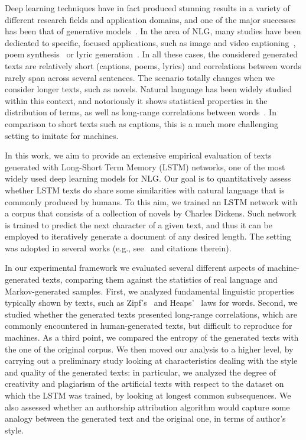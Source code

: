 \documentclass[journal]{IEEEtran}
\begin{document}
Deep learning techniques have in fact produced stunning results in a variety of different research fields and application domains, and one of the major successes has been that of generative models~\cite{Bengio2009}. In the area of NLG, many studies have been dedicated to specific, focused applications, such as image and video captioning~\cite{Karpathy2015,Venugopalan2015}, poem synthesis~\cite{Zhang2014} or lyric generation~\cite{Potash2015}. In all these cases, the considered generated texts are relatively short (captions, poems, lyrics) and correlations between words rarely span across several sentences. The scenario totally changes when we consider longer texts, such as novels. Natural language has been widely studied within this context, and notoriously it shows statistical properties in the distribution of terms, as well as long-range correlations between words~\cite{Ebeling1995, Montemurro2002, Altmann2012}.
%
In comparison to short texts such as captions, this is a much more challenging setting to imitate for machines.

In this work, we aim to provide an extensive empirical evaluation of texts generated with Long-Short Term Memory (LSTM) networks, one of the most widely used deep learning models for NLG. Our goal is to quantitatively assess whether LSTM texts do share some similarities with natural language that is commonly produced by humans.
%
To this aim, we trained an LSTM network with a corpus that consists of a collection of novels by Charles Dickens. Such network is trained to predict the next character of a given text, and thus it can be employed to iteratively generate a document of any desired length. The setting was adopted in several works (e.g., see~\cite{Graves2013,Karpathy2015understanding} and citations therein).

In our experimental framework we evaluated several different aspects of machine-generated texts, comparing them against the statistics of real language and Markov-generated samples. First, we analyzed fundamental linguistic properties typically shown by texts, such as Zipf's~\cite{Zipf1935} and Heaps'~\cite{Heaps1978} laws for words. Second, we studied whether the generated texts presented long-range correlations, which are commonly encountered in human-generated texts, but difficult to reproduce for machines. As a third point, we compared the entropy of the generated texts with the one of the original corpus. We then moved our analysis to a higher level, by carrying out a preliminary study looking at characteristics dealing with the style and quality of the generated texts: in particular, we analyzed the degree of creativity and plagiarism of the artificial texts with respect to the dataset on which the LSTM was trained, by looking at longest common subsequences. We also assessed whether an authorship attribution algorithm would capture some analogy between the generated text and the original one, in terms of author's style.
\end{document}
